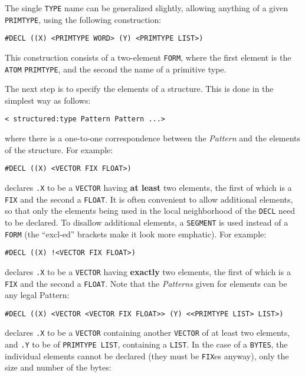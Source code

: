 \documentclass[a4paper,]{article}
\begin{document}
The single \texttt{TYPE} name can be generalized slightly, allowing anything of a given \texttt{PRIMTYPE}, using the
following construction:

\begin{verbatim}
#DECL ((X) <PRIMTYPE WORD> (Y) <PRIMTYPE LIST>)
\end{verbatim}

This construction consists of a two-element \texttt{FORM}, where the first element is the \texttt{ATOM} \texttt{PRIMTYPE},
and the second the name of a primitive type.

The next step is to specify the elements of a structure. This is done in the simplest way as follows:

\begin{verbatim}
< structured:type Pattern Pattern ...>
\end{verbatim}

where there is a one-to-one correspondence between the \emph{Pattern} and the elements of the structure. For example:

\begin{verbatim}
#DECL ((X) <VECTOR FIX FLOAT>)
\end{verbatim}

declares \texttt{.X} to be a \texttt{VECTOR} having \textbf{at least} two elements, the first of which is a \texttt{FIX}
and the second a \texttt{FLOAT}. It is often convenient to allow additional elements, so that only the elements being used
in the local neighborhood of the \texttt{DECL} need to be declared. To disallow additional elements, a \texttt{SEGMENT} is
used instead of a \texttt{FORM} (the ``excl-ed'' brackets make it look more emphatic). For example:

\begin{verbatim}
#DECL ((X) !<VECTOR FIX FLOAT>)
\end{verbatim}

declares \texttt{.X} to be a \texttt{VECTOR} having \textbf{exactly} two elements, the first of which is a \texttt{FIX} and
the second a \texttt{FLOAT}. Note that the \emph{Patterns} given for elements can be any legal Pattern:

\begin{verbatim}
#DECL ((X) <VECTOR <VECTOR FIX FLOAT>> (Y) <<PRIMTYPE LIST> LIST>)
\end{verbatim}

declares \texttt{.X} to be a \texttt{VECTOR} containing another \texttt{VECTOR} of at least two elements, and \texttt{.Y}
to be of \texttt{PRIMTYPE\ LIST}, containing a \texttt{LIST}. In the case of a \texttt{BYTES}, the individual elements
cannot be declared (they must be \texttt{FIX}es anyway), only the size and number of the bytes:
\end{document}
